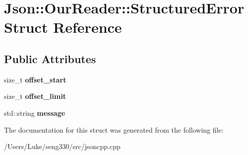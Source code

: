 \hypertarget{struct_json_1_1_our_reader_1_1_structured_error}{}\section{Json\+:\+:Our\+Reader\+:\+:Structured\+Error Struct Reference}
\label{struct_json_1_1_our_reader_1_1_structured_error}
\subsection*{Public Attributes}
\begin{DoxyCompactItemize}
\item 
\hypertarget{struct_json_1_1_our_reader_1_1_structured_error_a4eec161c2a6b4c89b6eb3d8d83834443}{}size\+\_\+t {\bfseries offset\+\_\+start}\label{struct_json_1_1_our_reader_1_1_structured_error_a4eec161c2a6b4c89b6eb3d8d83834443}

\item 
\hypertarget{struct_json_1_1_our_reader_1_1_structured_error_a6bab2650e5230fc15427b309de79fdbe}{}size\+\_\+t {\bfseries offset\+\_\+limit}\label{struct_json_1_1_our_reader_1_1_structured_error_a6bab2650e5230fc15427b309de79fdbe}

\item 
\hypertarget{struct_json_1_1_our_reader_1_1_structured_error_adc8a757b6452cc6ab14fb90b933b3414}{}std\+::string {\bfseries message}\label{struct_json_1_1_our_reader_1_1_structured_error_adc8a757b6452cc6ab14fb90b933b3414}

\end{DoxyCompactItemize}


The documentation for this struct was generated from the following file\+:\begin{DoxyCompactItemize}
\item 
/\+Users/\+Luke/seng330/src/jsoncpp.\+cpp\end{DoxyCompactItemize}
